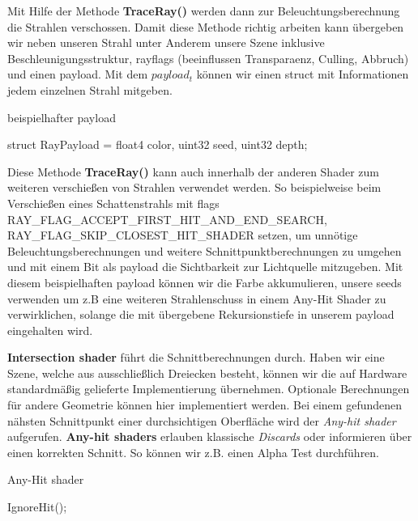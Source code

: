 Mit Hilfe der Methode \textbf{TraceRay()} werden dann zur Beleuchtungsberechnung 
die Strahlen verschossen. Damit diese Methode richtig arbeiten kann übergeben wir neben unseren Strahl 
unter Anderem  unsere Szene inklusive Beschleunigungsstruktur, rayflags 
(beeinflussen Transparaenz, Culling, Abbruch)\cite{RayFlags} und einen payload.
Mit dem \textit{$payload_t$} können wir einen struct mit Informationen jedem einzelnen Strahl mitgeben.

\begin{tcolorbox}
\begin{algorithm}[H]
    \caption{beispielhafter payload}
    \begin{algorithmic}[1]
        \State struct RayPayload = {float4 color, uint32 seed, uint32 depth};        
        \end{algorithmic}
        \label{alg:payload}
\end{algorithm}
\end{tcolorbox}
    
Diese Methode \textbf{TraceRay()} kann auch innerhalb der anderen Shader zum weiteren verschießen
von Strahlen verwendet werden. So beispielweise beim Verschießen eines Schattenstrahls mit flags 
RAY\_FLAG\_ACCEPT\_FIRST\_HIT\_AND\_END\_SEARCH, \newline
RAY\_FLAG\_SKIP\_CLOSEST\_HIT\_SHADER setzen, um unnötige 
Beleuchtungsberechnungen und weitere Schnittpunktberechnungen zu umgehen und mit einem Bit als payload 
die Sichtbarkeit zur Lichtquelle mitzugeben.
Mit diesem beispielhaften payload können wir die Farbe akkumulieren, unsere  
seeds verwenden um z.B eine weiteren Strahlenschuss in einem Any-Hit Shader zu verwirklichen,  
solange die mit übergebene Rekursionstiefe in unserem payload eingehalten wird.  

\textbf{Intersection shader} führt die Schnittberechnungen durch.
Haben wir eine Szene, welche aus ausschließlich Dreiecken besteht, können wir
die auf Hardware standardmäßig gelieferte Implementierung übernehmen. 
Optionale Berechnungen für andere Geometrie können hier implementiert werden.
Bei einem gefundenen nähsten Schnittpunkt einer durchsichtigen Oberfläche wird der 
\textit{Any-hit shader} aufgerufen.
\textbf{Any-hit shaders} erlauben klassische \textit{Discards} oder informieren
über einen korrekten Schnitt. So können wir z.B. einen Alpha Test durchführen.

\begin{tcolorbox}
\begin{algorithm}[H]
    \caption{Any-Hit shader}
    \begin{algorithmic}[1]
        \State IgnoreHit();
        \EndIf
    \end{algorithmic}
    \label{alg:any hit}
\end{algorithm}
\end{tcolorbox}

